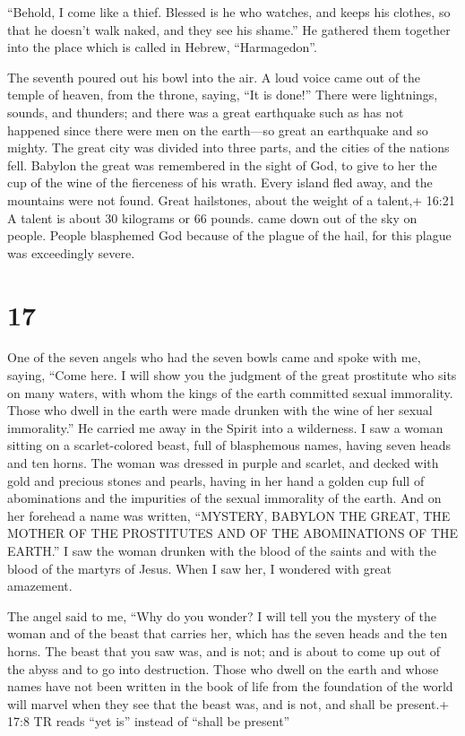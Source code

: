  ``Behold, I come like a thief. Blessed is he who watches,
and keeps his clothes, so that he doesn't walk naked, and they see his
shame.''  He gathered them together into the place which is
called in Hebrew, ``Harmagedon''.

 The seventh poured out his bowl into the air. A loud voice
came out of the temple of heaven, from the throne, saying, ``It is
done!''  There were lightnings, sounds, and thunders; and
there was a great earthquake such as has not happened since there were
men on the earth---so great an earthquake and so mighty. 
The great city was divided into three parts, and the cities of the
nations fell. Babylon the great was remembered in the sight of God, to
give to her the cup of the wine of the fierceness of his wrath.
 Every island fled away, and the mountains were not found.
 Great hailstones, about the weight of a talent,+ 16:21 A
talent is about 30 kilograms or 66 pounds. came down out of the sky on
people. People blasphemed God because of the plague of the hail, for
this plague was exceedingly severe.

\hypertarget{section-16}{%
\section{17}\label{section-16}}

 One of the seven angels who had the seven bowls came and
spoke with me, saying, ``Come here. I will show you the judgment of the
great prostitute who sits on many waters,  with whom the
kings of the earth committed sexual immorality. Those who dwell in the
earth were made drunken with the wine of her sexual immorality.''
 He carried me away in the Spirit into a wilderness. I saw a
woman sitting on a scarlet-colored beast, full of blasphemous names,
having seven heads and ten horns.  The woman was dressed in
purple and scarlet, and decked with gold and precious stones and pearls,
having in her hand a golden cup full of abominations and the impurities
of the sexual immorality of the earth.  And on her forehead
a name was written, ``MYSTERY, BABYLON THE GREAT, THE MOTHER OF THE
PROSTITUTES AND OF THE ABOMINATIONS OF THE EARTH.''  I saw
the woman drunken with the blood of the saints and with the blood of the
martyrs of Jesus. When I saw her, I wondered with great amazement.

 The angel said to me, ``Why do you wonder? I will tell you
the mystery of the woman and of the beast that carries her, which has
the seven heads and the ten horns.  The beast that you saw
was, and is not; and is about to come up out of the abyss and to go into
destruction. Those who dwell on the earth and whose names have not been
written in the book of life from the foundation of the world will marvel
when they see that the beast was, and is not, and shall be present.+
17:8 TR reads ``yet is'' instead of ``shall be present''

